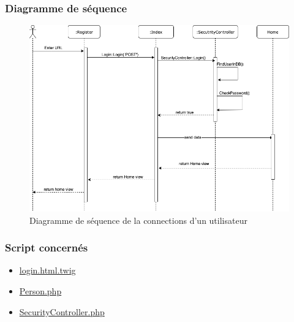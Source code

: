 		
\subsubsection{Diagramme de séquence}
	\begin{figure}[h!]
		\includegraphics[width = \textwidth,center]{Diagramme/sequence-us0}
		\caption{Diagramme de séquence de la connections d'un utilisateur}
	\end{figure}

\subsubsection{Script concernés}
	\begin{itemize}
		\item \href{https://github.com/victorsmits/Aquabike/blob/master/Symfony-Twig/templates/security/login.html.twig}{login.html.twig}
		\item \href{https://github.com/victorsmits/Aquabike/blob/master/Symfony-Twig/src/Entity/Person.php}{Person.php}
		\item \href{https://github.com/victorsmits/Aquabike/blob/master/Symfony-Twig/src/Controller/SecurityController.php}{SecurityController.php}
	\end{itemize}